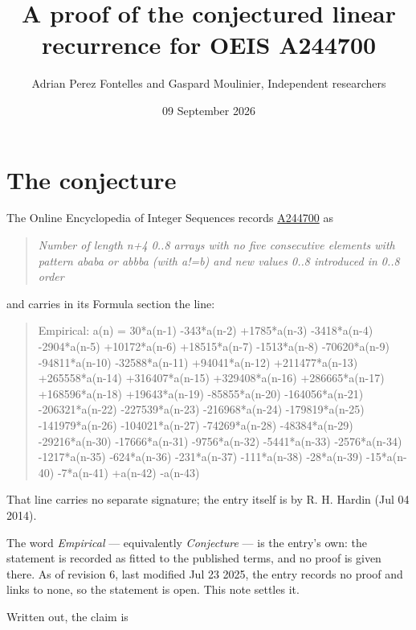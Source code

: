 \documentclass[11pt]{article}
\title{A proof of the conjectured linear recurrence for OEIS A244700}
\author{Adrian Perez Fontelles and Gaspard Moulinier, Independent researchers}
\date{09 September 2026}
\theoremstyle{definition}
\begin{document}
\maketitle
\section{The conjecture}

The Online Encyclopedia of Integer Sequences records \href{https://oeis.org/A244700}{A244700} as

\begin{quote}\itshape Number of length n+4 0..8 arrays with no five consecutive elements with pattern ababa or abbba (with a!=b) and new values 0..8 introduced in 0..8 order\end{quote}

and carries in its Formula section the line:

\begin{quote}\ttfamily Empirical: a(n) = 30*a(n-1) -343*a(n-2) +1785*a(n-3) -3418*a(n-4) -2904*a(n-5) +10172*a(n-6) +18515*a(n-7) -1513*a(n-8) -70620*a(n-9) -94811*a(n-10) -32588*a(n-11) +94041*a(n-12) +211477*a(n-13) +265558*a(n-14) +316407*a(n-15) +329408*a(n-16) +286665*a(n-17) +168596*a(n-18) +19643*a(n-19) -85855*a(n-20) -164056*a(n-21) -206321*a(n-22) -227539*a(n-23) -216968*a(n-24) -179819*a(n-25) -141979*a(n-26) -104021*a(n-27) -74269*a(n-28) -48384*a(n-29) -29216*a(n-30) -17666*a(n-31) -9756*a(n-32) -5441*a(n-33) -2576*a(n-34) -1217*a(n-35) -624*a(n-36) -231*a(n-37) -111*a(n-38) -28*a(n-39) -15*a(n-40) -7*a(n-41) +a(n-42) -a(n-43)\end{quote}

That line carries no separate signature; the entry itself is by R. H. Hardin (Jul 04 2014).

The word {\itshape Empirical} --- equivalently {\itshape Conjecture} --- is the entry's own: the statement is recorded as fitted to the published terms, and no proof is given there. As of revision 6, last modified Jul 23 2025, the entry records no proof and links to none, so the statement is open. This note settles it.

Written out, the claim is
\end{document}
